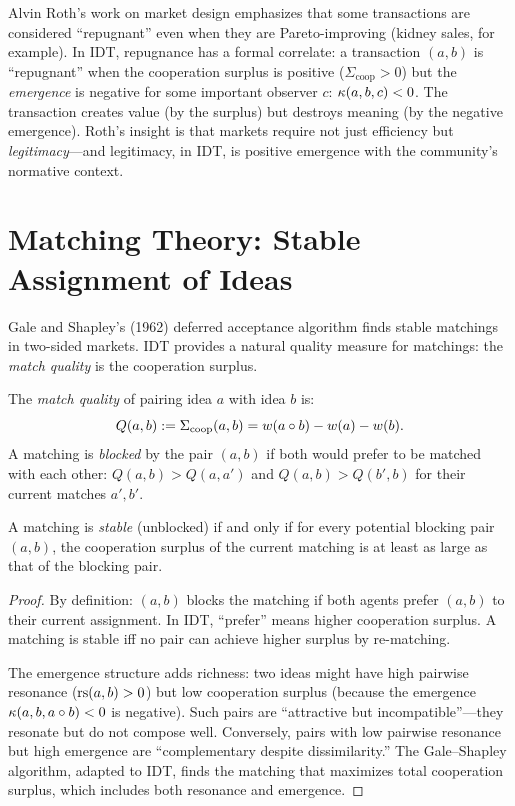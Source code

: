 \begin{interpretation}
Alvin Roth's work on market design emphasizes that some transactions are
considered ``repugnant'' even when they are Pareto-improving (kidney sales,
for example). In IDT, repugnance has a formal correlate: a transaction
$(a, b)$ is ``repugnant'' when the cooperation surplus is positive
($\Sigma_{\text{coop}} > 0$) but the \emph{emergence} is negative for
some important observer $c$: $\kappa(a, b, c) < 0$. The transaction
creates value (by the surplus) but destroys meaning (by the negative
emergence). Roth's insight is that markets require not just efficiency
but \emph{legitimacy}---and legitimacy, in IDT, is positive emergence
with the community's normative context.
\end{interpretation}


\section{Matching Theory: Stable Assignment of Ideas}

Gale and Shapley's (1962) deferred acceptance algorithm finds stable
matchings in two-sided markets. IDT provides a natural quality measure
for matchings: the \emph{match quality} is the cooperation surplus.

\begin{definition}
\label{def:match-quality}
The \emph{match quality} of pairing idea $a$ with idea $b$ is:
\[
Q(a, b) := \Sigma_{\text{coop}}(a, b) = w(a \circ b) - w(a) - w(b).
\]
A matching is \emph{blocked} by the pair $(a, b)$ if both would prefer
to be matched with each other: $Q(a, b) > Q(a, a')$ and $Q(a, b) > Q(b', b)$
for their current matches $a', b'$.
\end{definition}

\begin{theorem}
\label{thm:matching-stability}
A matching is \emph{stable} (unblocked) if and only if for every
potential blocking pair $(a, b)$, the cooperation surplus of the
current matching is at least as large as that of the blocking pair.
\end{theorem}

\begin{proof}
By definition: $(a, b)$ blocks the matching if both agents prefer
$(a, b)$ to their current assignment. In IDT, ``prefer'' means
higher cooperation surplus. A matching is stable iff no pair can
achieve higher surplus by re-matching.

The emergence structure adds richness: two ideas might have high
pairwise resonance ($\mathrm{rs}(a, b) > 0$) but low cooperation surplus
(because the emergence $\kappa(a, b, a \circ b) < 0$ is negative).
Such pairs are ``attractive but incompatible''---they resonate but
do not compose well. Conversely, pairs with low pairwise resonance
but high emergence are ``complementary despite dissimilarity.''
The Gale--Shapley algorithm, adapted to IDT, finds the matching that
maximizes total cooperation surplus, which includes both resonance
and emergence.
\end{proof}

